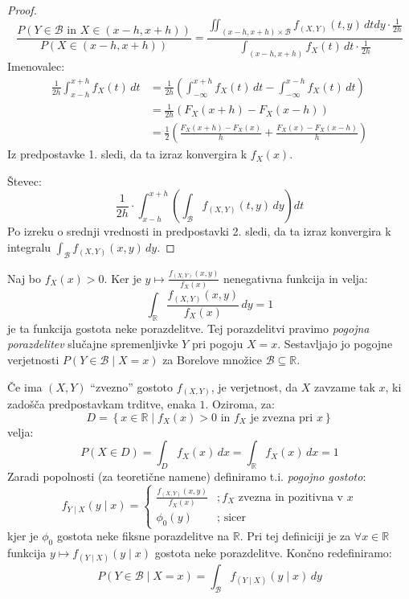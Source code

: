 \documentclass[12pt]{book}
\def\n{\noindent}
\theoremstyle{definition}
\theoremstyle{plain}
\theoremstyle{plain}
\theoremstyle{plain}
\theoremstyle{remark}
\begin{document}
\begin{proof}
    $$
    \frac{P(Y \in \mathcal{B} \text { in } X \in(x-h, x+h))}{P(X \in(x-h, x+h))}=\frac{\iint_{(x-h, x+h) \times \mathcal{B}} f_{(X, Y)}(t, y) \, d t d y \cdot \frac{1}{2 h}}{\int_{(x-h, x+h)} f_X(t) \,d t \cdot \frac{1}{2 h}}
    $$
    Imenovalec: 
    $$
    \begin{aligned}
        \frac{1}{2 h} \int_{x-h}^{x+h} f_X(t) \, d t&=\frac{1}{2 h}\left(\int_{-\infty}^{x+h} f_X(t) \,d t-\int_{-\infty}^{x-h} f_X(t) \, d t\right) \\
        &=\frac{1}{2 h}\left(F_X(x+h)-F_X(x-h)\right) \\
        &=\frac{1}{2}\left(\frac{F_X(x+h)-F_X(x)}{h}+\frac{F_X(x)-F_X(x-h)}{h}\right)
    \end{aligned}
    $$
    Iz predpostavke 1. sledi, da ta izraz konvergira k $f_X(x)$.

    \n Števec:
    $$
    \frac{1}{2 h} \cdot \int_{x-h}^{x+h}\left(\int_{\mathcal{B}} f_{(X, Y)}(t, y) \, d y\right) d t
    $$
    Po izreku o srednji vrednosti in predpostavki 2. sledi, da ta izraz konvergira k integralu $\int_{\mathcal{B}} f_{(X, Y)}(x, y) \, d y$.
\end{proof}

\n Naj bo $f_X(x)>0$. Ker je $y \mapsto \frac{f_{(X, Y)}(x, y)}{f_X(x)}$ nenegativna funkcija in velja:
$$
\int_{\mathbb{R}} \frac{f_{(X, Y)}(x, y)}{f_X(x)} \,d y=1
$$
je ta funkcija gostota neke porazdelitve. Tej porazdelitvi pravimo \emph{pogojna porazdelitev} slučajne spremenljivke $Y$ pri pogoju $X=x$. Sestavljajo jo pogojne verjetnosti $P(Y \in \mathcal{B} \mid X=x)$ za Borelove množice $\mathcal{B} \subseteq \mathbb{R}$.

\n Če ima $(X,Y)$ “zvezno” gostoto $f_{(X,Y)}$, je verjetnost, da $X$ zavzame tak $x$, ki zadošča predpostavkam trditve, enaka $1$. Oziroma, za:
$$
D=\left\{x \in \mathbb{R} \mid f_X(x)>0 \text{ in }f_X \text{ je zvezna pri } x\right\}
$$
velja: 
$$
P(X \in D)=\int_D f_X(x) \,d x=\int_{\mathbb{R}} f_X(x) \, d x=1
$$
Zaradi popolnosti (za teoretične namene) definiramo t.i. \emph{pogojno gostoto}:
$$
f_{Y \mid X}(y \mid x)=\begin{cases}
    \frac{f_{(X, Y)}(x, y)}{f_X(x)} &;f_X \text { zvezna in pozitivna v }x \\
    \phi_0(y) &; \text { sicer }
    \end{cases}
$$
kjer je $\phi_0$ gostota neke fiksne porazdelitve na $\mathbb{R}$. Pri tej definiciji je za $\forall x \in \mathbb{R}$ funkcija $y \mapsto f_{(Y \mid X)}(y \mid x)$ gostota neke porazdelitve. Končno redefiniramo: 
$$
P(Y \in \mathcal{B} \mid X=x)=\int_{\mathcal{B}} f_{(Y \mid X)}(y \mid x) \, d y
$$
\end{document}
